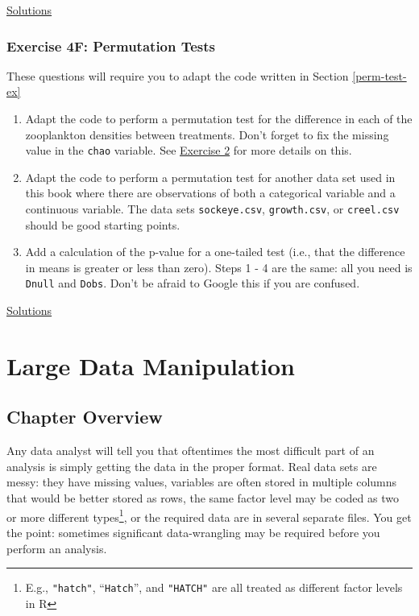 \documentclass[]{book}
\providecommand{\tightlist}{%
  \setlength{\itemsep}{0pt}\setlength{\parskip}{0pt}}
\let\rmarkdownfootnote\footnote%
\def\footnote{\protect\rmarkdownfootnote}
\theoremstyle{definition}
\theoremstyle{definition}
\theoremstyle{definition}
\theoremstyle{remark}
\begin{document}
\protect\hyperlink{ex4e-answers}{Solutions}

\subsection*{Exercise 4F: Permutation
Tests}\label{exercise-4f-permutation-tests}

These questions will require you to adapt the code written in Section
\ref{perm-test-ex}

\begin{enumerate}
\def\labelenumi{\arabic{enumi}.}
\tightlist
\item
  Adapt the code to perform a permutation test for the difference in
  each of the zooplankton densities between treatments. Don't forget to
  fix the missing value in the \texttt{chao} variable. See
  \protect\hyperlink{ex1b}{Exercise 2} for more details on this.
\item
  Adapt the code to perform a permutation test for another data set used
  in this book where there are observations of both a categorical
  variable and a continuous variable. The data sets
  \texttt{sockeye.csv}, \texttt{growth.csv}, or \texttt{creel.csv}
  should be good starting points.
\item
  Add a calculation of the p-value for a one-tailed test (i.e., that the
  difference in means is greater or less than zero). Steps 1 - 4 are the
  same: all you need is \texttt{Dnull} and \texttt{Dobs}. Don't be
  afraid to Google this if you are confused.
\end{enumerate}

\protect\hyperlink{ex4f-answers}{Solutions}

\chapter{Large Data Manipulation}\label{ch5}

\section*{Chapter Overview}\label{chapter-overview-4}

Any data analyst will tell you that oftentimes the most difficult part
of an analysis is simply getting the data in the proper format. Real
data sets are messy: they have missing values, variables are often
stored in multiple columns that would be better stored as rows, the same
factor level may be coded as two or more different types\footnote{E.g.,
  \texttt{"hatch"}, ``\texttt{Hatch}'', and \texttt{"HATCH"} are all
  treated as different factor levels in R}, or the required data are in
several separate files. You get the point: sometimes significant
data-wrangling may be required before you perform an analysis.
\end{document}
